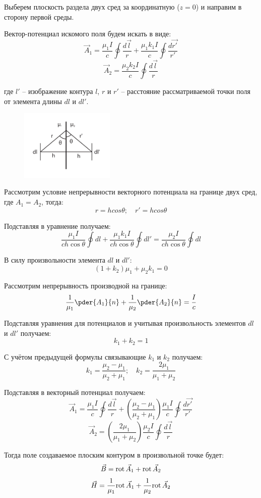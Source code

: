 Выберем плоскость раздела двух сред за координатную (\( z = 0 \)) и направим в 
сторону первой среды.

Вектор-потенциал искомого поля будем искать в виде:
\[
	\vec{A}_1 = \frac{\mu_1 I}{c} \oint \frac{d\vec{l}}{r} + 
		\frac{\mu_1 k_1 I}{c} \oint \frac{d\vec{r'}}{r'}
\]
\[
	\vec{A}_2 = \frac{\mu_2 k_2 I}{c} \oint \frac{d\vec{l}}{r}
\]

где \( l' \) -- изображение контура \( l \), \( r \) и \( r' \) -- 
расстояние рассматриваемой точки поля от элемента длины \( dl \) и \( dl' \).

\begin{figure}
	\vspace{-5ex}
	\includegraphics[width=0.4\textwidth]{pdf/image_2_35_2}
\end{figure}

Рассмотрим условие непрерывности векторного потенциала на границе
двух сред, где \( A_1 = A_2 \), тогда:
\[
	r = hcos\theta;\quad r' = hcos\theta
\]

Подставляя в уравнение получаем:
\[
	\frac{\mu_1 I}{ch\cos\theta} \oint dl + 
	\frac{\mu_1 k_1 I}{ch\cos\theta} \oint dl' = 
	\frac{\mu_2 I}{ch\cos\theta} \oint dl
\]

В силу произвольности элемента \( dl \) и \( dl' \):
\[ 
	\left( 1 + k_2 \right) \mu_1 + \mu_2 k_1 = 0
\]

Рассмотрим непрерывность производной на границе:
\[
	\frac{1}{\mu_1}\pder{A_1}{n} + \frac{1}{\mu_2}\pder{A_2}{n} = \frac{I}{c}
\]

\pagebreak

Подставляя уравнения для потенциалов и учитывая произвольность элементов 
\( dl \) и \( dl' \) получаем:
\[
	k_1 + k_2 = 1
\]

С учётом предыдущей формулы связывающие \( k_1 \) и \( k_2 \) получаем:
\[
	k_1 = \frac{\mu_2 - \mu_1}{\mu_2 + \mu_1};\quad
	k_2 = \frac{2\mu_1}{\mu_1 + \mu_2}
\]

Подставляя в векторный потенциал получаем:
\[
	\vec{A}_1 = \frac{\mu_1 I}{c} \oint \frac{d\vec{l}}{r} + 
		\left(\frac{\mu_2 - \mu_1}{\mu_2 + \mu_1}\right)
		\frac{\mu_1 I}{c} \oint \frac{d\vec{r'}}{r'}
\]
\[
	\vec{A}_2 = \left(\frac{2\mu_1}{\mu_1 + \mu_2}\right)
	\frac{\mu_2 I}{c} \oint \frac{d\vec{l}}{r}
\]

Тогда поле создаваемое плоским контуром в произвольной точке будет:
\[
	\vec{B} = \mathrm{rot}\,\vec{A}_1 + \mathrm{rot}\,\vec{A}_2
\]
\[
	\vec{H} = \frac{1}{\mu_1}\mathrm{rot}\,\vec{A}_1 + \frac{1}{\mu_2}\mathrm{rot}\,\vec{A}_2 
\]

